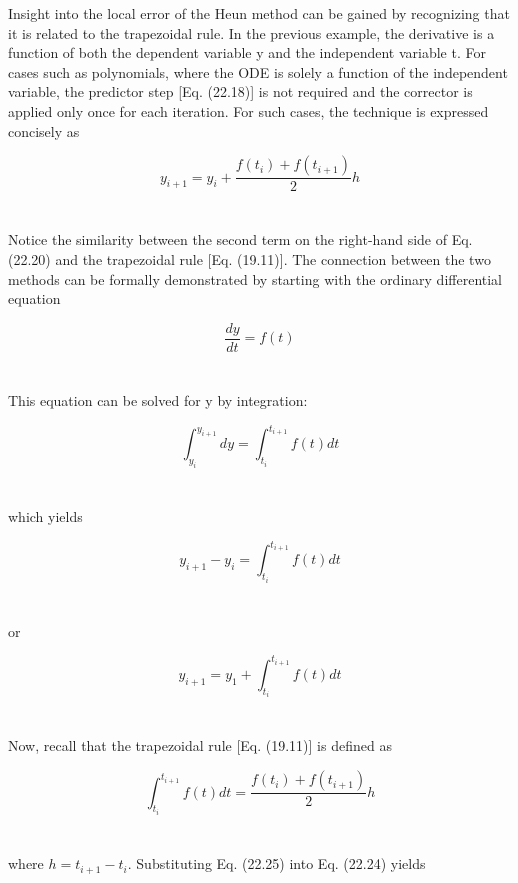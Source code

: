 \documentclass[../main.tex]{subfiles}
\begin{document}
Insight into the local error of the Heun method can be gained by recognizing that it is
related to the trapezoidal rule. In the previous example, the derivative is a function of both
the dependent variable y and the independent variable t. For cases such as polynomials,
where the ODE is solely a function of the independent variable, the predictor step
[Eq. (22.18)] is not required and the corrector is applied only once for each iteration. For
such cases, the technique is expressed concisely as

\begin{equation}
\tag{22.20}
y_{i+1} = y_{i} + \dfrac{f(t_{i}) + f(t_{i+1})}{2}h
\end{equation}\\
\\
Notice the similarity between the second term on the right-hand side of Eq. (22.20) and the
trapezoidal rule [Eq. (19.11)]. The connection between the two methods can be formally
demonstrated by starting with the ordinary differential equation

\begin{equation}
\tag{22.21}
\dfrac{dy}{dt} = f(t)
\end{equation}\\
\\
This equation can be solved for y by integration:

\begin{equation}
\tag{22.22}
\int^{y_{i+1}}_{y_{i}} dy = \int^{t_{i+1}}_{t_{i}} f(t)dt
\end{equation}\\
\\
which yields

\begin{equation}
\tag{22.23}
y_{i+1} - y_{i} = \int^{t_{i+1}}_{t_{i}} f(t)dt
\end{equation}\\
\\
or

\begin{equation}
\tag{22.24}
y_{i+1} = y_{1} + \int^{t_{i+1}}_{t_{i}} f(t)dt
\end{equation}\\
\\
Now, recall that the trapezoidal rule [Eq. (19.11)] is defined as


\begin{equation}
\tag{22.25}
\int^{t_{i+1}}_{t_{i}} f(t)dt = \dfrac{f(t_{i})+ f(t_{i+1})}{2}h
\end{equation}\\
\\
where $h = t_{i+1} - t_{i}$. Substituting Eq. (22.25) into Eq. (22.24) yields
\end{document}
